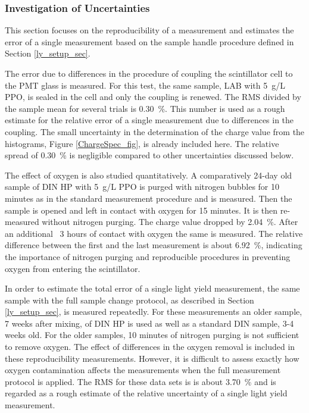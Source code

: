 \documentclass{JINST}
\begin{document}
\subsubsection{Investigation of Uncertainties}
This section focuses on the reproducibility of a measurement and estimates the error of a single measurement based on the sample handle procedure defined in Section \ref{ly_setup_sec}. 

The error due to differences in the procedure of coupling the scintillator cell to the PMT glass is measured. For this test, the same sample, LAB with 5~g/L PPO, is sealed in the cell and only the coupling is renewed. The RMS divided by the sample mean for several trials is 0.30~\%. This number is used as a rough estimate for the relative error of a single measurement due to differences in the coupling. The small uncertainty in the determination of the charge value from the histograms, Figure \ref{ChargeSpec_fig}, is already included here. The relative spread of 0.30~\% is negligible compared to other uncertainties discussed below.   

The effect of oxygen is also studied quantitatively. A comparatively 24-day old sample of DIN HP with 5~g/L PPO is purged with nitrogen bubbles for 10 minutes as in the standard measurement procedure and is measured. Then the sample is opened and left in contact with oxygen for 15 minutes. It is then re-measured without nitrogen purging. The charge value dropped by 2.04~\%. After an additional ~3 hours of contact with oxygen the same is measured. The relative difference between the first and the last measurement is about 6.92~\%, indicating the importance of nitrogen purging and reproducible procedures in preventing oxygen from entering the scintillator. 

In order to estimate the total error of a single light yield measurement, the same sample with the full sample change protocol, as described in Section \ref{ly_setup_sec}, is measured repeatedly. For these measurements an older sample, 7 weeks after mixing, of DIN HP is used as well as a standard DIN sample, 3-4 weeks old. For the older samples, 10 minutes of nitrogen purging is not sufficient to remove oxygen. The effect of differences in the oxygen removal is included in these reproducibility measurements. However, it is difficult to assess exactly how oxygen contamination affects the measurements when the full measurement protocol is applied. The RMS for these data sets 
is is about 3.70~\% and is regarded as a rough estimate of the relative uncertainty of a single light yield measurement.
\end{document}
